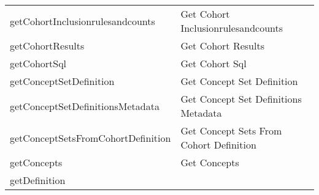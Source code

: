 \documentclass[
]{article}
\begin{document}
\begin{longtable}[]{@{}ll@{}}
\begin{minipage}[t]{0.46\columnwidth}
getCohortInclusionrulesandcounts\strut
\end{minipage} & \begin{minipage}[t]{0.48\columnwidth}\raggedright
Get Cohort Inclusionrulesandcounts\strut
\end{minipage}\tabularnewline
\begin{minipage}[t]{0.46\columnwidth}\raggedright
getCohortResults\strut
\end{minipage} & \begin{minipage}[t]{0.48\columnwidth}\raggedright
Get Cohort Results\strut
\end{minipage}\tabularnewline
\begin{minipage}[t]{0.46\columnwidth}\raggedright
getCohortSql\strut
\end{minipage} & \begin{minipage}[t]{0.48\columnwidth}\raggedright
Get Cohort Sql\strut
\end{minipage}\tabularnewline
\begin{minipage}[t]{0.46\columnwidth}\raggedright
getConceptSetDefinition\strut
\end{minipage} & \begin{minipage}[t]{0.48\columnwidth}\raggedright
Get Concept Set Definition\strut
\end{minipage}\tabularnewline
\begin{minipage}[t]{0.46\columnwidth}\raggedright
getConceptSetDefinitionsMetadata\strut
\end{minipage} & \begin{minipage}[t]{0.48\columnwidth}\raggedright
Get Concept Set Definitions Metadata\strut
\end{minipage}\tabularnewline
\begin{minipage}[t]{0.46\columnwidth}\raggedright
getConceptSetsFromCohortDefinition\strut
\end{minipage} & \begin{minipage}[t]{0.48\columnwidth}\raggedright
Get Concept Sets From Cohort Definition\strut
\end{minipage}\tabularnewline
\begin{minipage}[t]{0.46\columnwidth}\raggedright
getConcepts\strut
\end{minipage} & \begin{minipage}[t]{0.48\columnwidth}\raggedright
Get Concepts\strut
\end{minipage}\tabularnewline
\begin{minipage}[t]{0.46\columnwidth}\raggedright
getDefinition\strut

\end{minipage}
\end{longtable}
\end{document}
